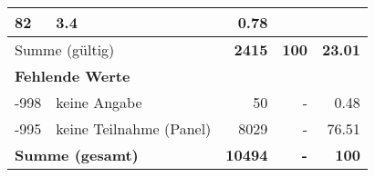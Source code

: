 \begin{longtable}{lXrrr}
       \num{82} &
       \num[round-mode=places,round-precision=2]{3,4} &
         \num[round-mode=places,round-precision=2]{0,78} \\
     \midrule
     \multicolumn{2}{l}{Summe (gültig)} &
       \textbf{\num{2415}} &
     \textbf{100} &
       \textbf{\num[round-mode=places,round-precision=2]{23,01}} \\
     \multicolumn{5}{l}{\textbf{Fehlende Werte}}\\
       -998 &
       keine Angabe &
         \num{50} &
        - &
         \num[round-mode=places,round-precision=2]{0,48} \\
       -995 &
       keine Teilnahme (Panel) &
         \num{8029} &
        - &
         \num[round-mode=places,round-precision=2]{76,51} \\
     \midrule
     \multicolumn{2}{l}{\textbf{Summe (gesamt)}} &
          \textbf{\num{10494}} &
        \textbf{-} &
        \textbf{100} \\
     \bottomrule
     \end{longtable}
     
